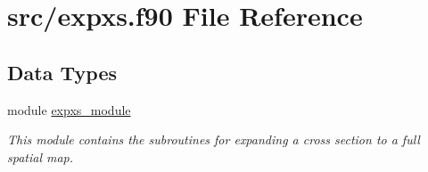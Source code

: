\hypertarget{expxs_8f90}{\section{src/expxs.f90 File Reference}
\label{expxs_8f90}
}
\subsection*{Data Types}
\begin{DoxyCompactItemize}
\item 
module \hyperlink{classexpxs__module}{expxs\-\_\-module}
\begin{DoxyCompactList}\small\item\em This module contains the subroutines for expanding a cross section to a full spatial map. \end{DoxyCompactList}\end{DoxyCompactItemize}
